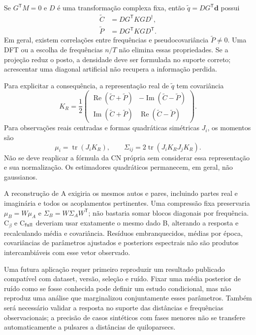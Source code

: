 Se $G^{\mathsf T}M=0$ e $D$ é uma transformação complexa fixa, então $\widetilde q=DG^{\mathsf T}\boldsymbol d$ possui
\begin{align}
 \widetilde C&=DG^{\mathsf T}KG D^\dagger,\\
 \widetilde P&=DG^{\mathsf T}KG D^{\mathsf T}.
\end{align}
Em geral, existem correlações entre frequências e pseudocovariância $\widetilde P\ne0$. Uma DFT ou a escolha de frequências $n/T$ não elimina essas propriedades. Se a projeção reduz o posto, a densidade deve ser formulada no suporte correto; acrescentar uma diagonal artificial não recupera a informação perdida.

Para explicitar a consequência, a representação real de $\widetilde q$ tem covariância
\begin{equation}
 K_R=\frac12\begin{pmatrix}
 \operatorname{Re}(\widetilde C+\widetilde P)&-\operatorname{Im}(\widetilde C-\widetilde P)\\
 \operatorname{Im}(\widetilde C+\widetilde P)&\operatorname{Re}(\widetilde C-\widetilde P)
 \end{pmatrix}.
\end{equation}
Para observações reais centradas e formas quadráticas simétricas $J_i$, os momentos são
\begin{equation}
 \mu_i=\operatorname{tr}(J_iK_R),\qquad
 \Sigma_{ij}=2\operatorname{tr}(J_iK_RJ_jK_R).
\end{equation}
Não se deve reaplicar a fórmula da CN própria sem considerar essa representação e sua normalização. Os estimadores quadráticos permanecem, em geral, não gaussianos.

A reconstrução de A exigiria os mesmos autos e pares, incluindo partes real e imaginária e todos os acoplamentos pertinentes. Uma compressão fixa preservaria $\mu_B=W\mu_A$ e $\Sigma_B=W\Sigma_AW^{\mathsf T}$; não bastaria somar blocos diagonais por frequência. C$_\beta$ e C$_{\rm full}$ deveriam usar exatamente o mesmo dado B, alterando a resposta e recalculando média e covariância. Resíduos embranquecidos, médias por época, covariâncias de parâmetros ajustados e posteriors espectrais não são produtos intercambiáveis com esse vetor observado.

Uma futura aplicação requer primeiro reproduzir um resultado publicado compatível com dataset, versão, seleção e ruído. Fixar uma média posterior de ruído como se fosse conhecida pode definir um estudo condicional, mas não reproduz uma análise que marginalizou conjuntamente esses parâmetros. Também será necessário validar a resposta no suporte das distâncias e frequências observacionais; a precisão de casos sintéticos com fases menores não se transfere automaticamente a pulsares a distâncias de quiloparsecs.

